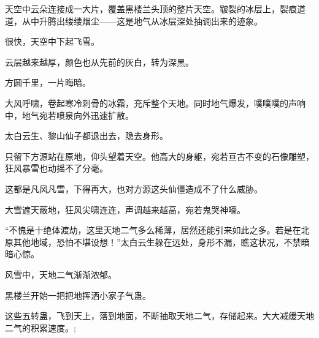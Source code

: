 \begin{this_body}
天空中云朵连接成一大片，覆盖黑楼兰头顶的整片天空。皲裂的冰层上，裂痕道道，从中升腾出缕缕烟尘——这是地气从冰层深处抽调出来的迹象。

很快，天空中下起飞雪。

云层越来越厚，颜色也从先前的灰白，转为深黑。

方圆千里，一片晦暗。

大风呼啸，卷起寒冷刺骨的冰霜，充斥整个天地。同时地气爆发，噗噗噗的声响中，地气宛若喷泉向外迅速扩散。

太白云生、黎山仙子都退出去，隐去身形。

只留下方源站在原地，仰头望着天空。他高大的身躯，宛若亘古不变的石像雕塑，狂风暴雪也动摇不了分毫。

这都是凡风凡雪，下得再大，也对方源这头仙僵造成不了什么威胁。

大雪遮天蔽地，狂风尖啸连连，声调越来越高，宛若鬼哭神嚎。

“不愧是十绝体渡劫，这里天地二气多么稀薄，居然还能引来如此之多。若是在北原其他地域，恐怕不堪设想！”太白云生躲在远处，身形不漏，瞧这状况，不禁暗暗心惊。

风雪中，天地二气渐渐浓郁。

黑楼兰开始一把把地挥洒小家子气蛊。

这些五转蛊，飞到天上，落到地面，不断抽取天地二气，存储起来。大大减缓天地二气的积累速度。;

\end{this_body}

